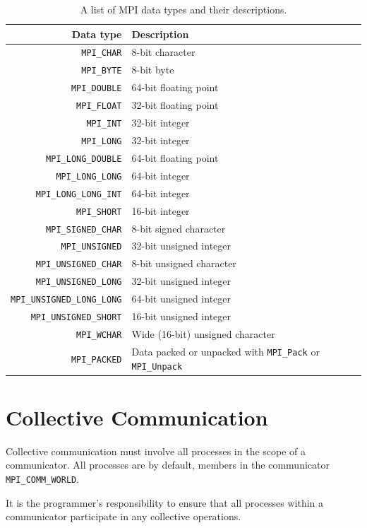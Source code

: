 \begin{table}
\caption{A list of MPI data types and their descriptions.}
\label{tab:mpidatatypes}
\begin{tabular}{|r|l|}
\hline
Data type & Description \\
\hline
\texttt{MPI\_CHAR} & 8-bit character \\
\texttt{MPI\_BYTE} & 8-bit byte \\
\texttt{MPI\_DOUBLE} & 64-bit floating point \\
\texttt{MPI\_FLOAT} & 32-bit floating point \\
\texttt{MPI\_INT} & 32-bit integer \\
\texttt{MPI\_LONG} & 32-bit integer \\
\texttt{MPI\_LONG\_DOUBLE} & 64-bit floating point \\
\texttt{MPI\_LONG\_LONG} & 64-bit integer \\
\texttt{MPI\_LONG\_LONG\_INT} & 64-bit integer \\
\texttt{MPI\_SHORT} & 16-bit integer \\
\texttt{MPI\_SIGNED\_CHAR} & 8-bit signed character \\
\texttt{MPI\_UNSIGNED} & 32-bit unsigned integer \\
\texttt{MPI\_UNSIGNED\_CHAR} & 8-bit unsigned character \\
\texttt{MPI\_UNSIGNED\_LONG} & 32-bit unsigned integer \\
\texttt{MPI\_UNSIGNED\_LONG\_LONG} & 64-bit unsigned integer \\
\texttt{MPI\_UNSIGNED\_SHORT} & 16-bit unsigned integer \\
\texttt{MPI\_WCHAR} & Wide (16-bit) unsigned character \\
\texttt{MPI\_PACKED} & Data packed or unpacked with \texttt{MPI\_Pack} or \texttt{MPI\_Unpack} \\
\hline
\end{tabular}
\end{table}

\section{Collective Communication}
Collective communication must involve all processes in the scope of a communicator. All processes are by default, members in the communicator \texttt{MPI\_COMM\_WORLD}.  

It is the programmer's responsibility to ensure that all processes within a communicator participate in any collective operations.

